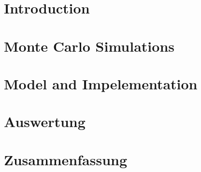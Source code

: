 \documentclass[a4paper,headsepline,bibtotocnumbered,12pt,titlepage,twoside]{scrartcl} %
\begin{document}
    
    \thispagestyle{empty}
    \cleardoublepage
    \setcounter{page}{1}
    \tableofcontents
    \newpage
    \listoffigures
    \newpage
    \setcounter{page}{1}

    \newpage
    \section{Introduction}
        

    \section{Monte Carlo Simulations}
        

    \section{Model and Impelementation}
        

    \section{Auswertung}
        

    \section{Zusammenfassung}

    
    
\end{document}
